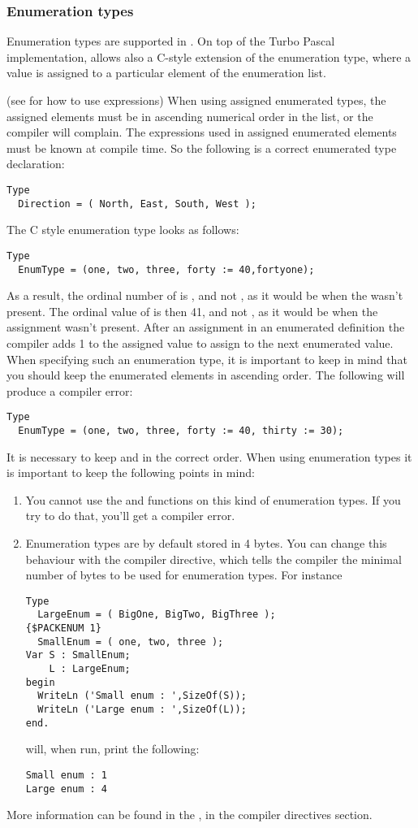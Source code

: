 \documentclass{report}
\begin{document}
\subsubsection{Enumeration types}
Enumeration types are supported in \fpc. On top of the Turbo Pascal
implementation, \fpc allows also a C-style extension of the
enumeration type, where a value is assigned to a particular element of
the enumeration list.

(see  for how to use expressions)
When using assigned enumerated types, the assigned elements must be in
ascending numerical order in the list, or the compiler will complain.
The expressions used in assigned enumerated elements must be known at
compile time.
So the following is a correct enumerated type declaration:
\begin{verbatim}
Type
  Direction = ( North, East, South, West );
\end{verbatim}
The C style enumeration type looks as follows:
\begin{verbatim}
Type
  EnumType = (one, two, three, forty := 40,fortyone);
\end{verbatim}
As a result, the ordinal number of  is , and not ,
as it would be when the  wasn't present.
The ordinal value of  is then {41}, and not , as it
would be when the assignment wasn't present. After an assignment in an
enumerated definition the compiler adds 1 to the assigned value to assign to
the next enumerated value.
When specifying such an enumeration type, it is important to keep in mind
that you should keep the enumerated elements in ascending order. The
following will produce a compiler error:
\renewcommand{\prelisting}{\sffamily}
\begin{verbatim}
Type
  EnumType = (one, two, three, forty := 40, thirty := 30);
\end{verbatim}
It is necessary to keep  and  in the correct order.
When using enumeration types it is important to keep the following points
in mind:
\begin{enumerate}
\item You cannot use the  and  functions on
this kind of enumeration types. If you try to do that, you'll get a compiler
error.
\item Enumeration types are by default stored in 4 bytes. You can change
this behaviour with the  compiler directive, which
tells the compiler the minimal number of bytes to be used for enumeration
types.
For instance
\begin{verbatim}
Type
  LargeEnum = ( BigOne, BigTwo, BigThree );
{$PACKENUM 1}
  SmallEnum = ( one, two, three );
Var S : SmallEnum;
    L : LargeEnum;
begin
  WriteLn ('Small enum : ',SizeOf(S));
  WriteLn ('Large enum : ',SizeOf(L));
end.
\end{verbatim}
will, when run, print the following:
\begin{verbatim}
Small enum : 1
Large enum : 4
\end{verbatim}
\end{enumerate}
More information can be found in the \progref, in the compiler directives
section.
\end{document}
